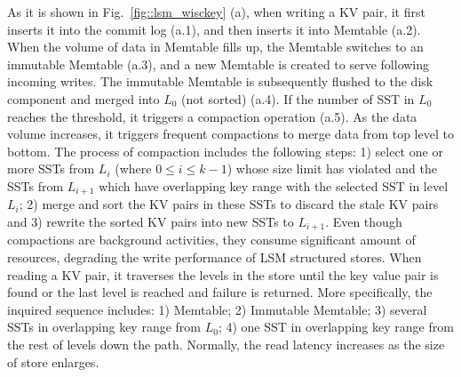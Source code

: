 \documentclass[sigconf]{acmart}
\begin{document}
As it is shown in Fig.~\ref{fig::lsm_wisckey} (a), when writing a KV pair, it first inserts it into the commit log (a.1), and then inserts it into Memtable (a.2). When the volume of data in Memtable fills up, the Memtable switches to an immutable Memtable (a.3), and a new Memtable is created to serve following incoming writes. The immutable Memtable is subsequently flushed to the disk component and merged into $L_0$ (not sorted) (a.4). If the number of SST in $L_0$ reaches the threshold, it triggers a compaction operation (a.5). As the data volume increases, it triggers frequent compactions to merge data from top level to bottom. The process of compaction includes the following steps: 1) select one or more SSTs from $L_i$ (where 0$\le$$i$$\le$$k-1$)  whose size limit has violated and the SSTs  from $L_{i+1}$ which have overlapping key range with the selected SST in level $L_i$; 2) merge and sort the KV pairs in these SSTs to discard the stale KV pairs and 3) rewrite the sorted KV pairs into new SSTs to $L_{i+1}$. Even though compactions are background activities, they consume significant amount of resources, degrading the write performance of LSM structured stores. When reading a KV pair, it traverses the levels in the store until the key value pair is found or the last level is reached and failure is returned. More specifically, the inquired sequence includes: 1) Memtable; 2) Immutable Memtable; 3) several SSTs in overlapping key range from $L_0$; 4) one SST in overlapping key range from the rest of levels down the path. Normally, the read latency increases as the size of store enlarges. 




\end{document}
